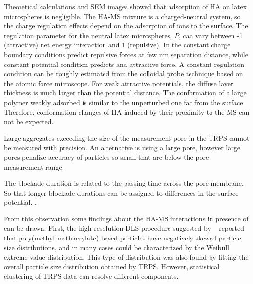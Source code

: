 \documentclass[journal=langd5,manuscript=article]{achemso}
\begin{document}
Theoretical calculations and SEM images showed that adsorption of  HA on latex microspheres is negligible. The HA-MS mixture is a charged-neutral system, so the charge regulation effects depend on the adsorption of ions to the surface. The regulation parameter for the neutral latex microspheres, $P$, can vary between -1 (attractive) net energy interaction and 1  (repulsive). In the constant charge boundary conditions predict  repulsive forces at few nm separation distance, while constant potential condition predicts and attractive force\cite{Trefalt2014}. A constant regulation condition can be roughly estimated from the  colloidal probe technique based on the atomic force microscope\cite{Ruiz-Cabello2013}.
For weak attractive potentials, the diffuse layer thickness is much larger than the potential distance. The conformation of a large  polymer weakly adsorbed is similar to the unperturbed one far from the surface\cite{Netz2003}. Therefore, conformation changes of HA induced by their proximity to the MS can not be expected.

Large aggregates exceeding  the size of the measurement pore in the TRPS cannot be measured with precision. An alternative is using a  large pore, however large pores penalize accuracy of particles so small that are below the pore measurement range.


The blockade duration is related to the passing time across the pore membrane. So that longer blockade durations can be assigned to differences in the surface potential.
\citeauthor{Weatherall2016}
\citeyear{Weatherall2016}.

From this observation  some findings about the HA-MS interactions in presence of  can be drawn.
 First, the  high resolution DLS procedure suggested by
 ~\citeauthor{Bryant2003AccurateSuspensions}\cite{Bryant2003AccurateSuspensions} 
reported  that poly(methyl methacrylate)-based particles have negatively
skewed particle size distributions, and in many cases could be characterized
by the Weibull extreme value distribution. This type of distribution 
was also found by fitting the overall particle size distribution obtained by TRPS. However, statistical clustering of TRPS data can resolve different components.
\end{document}
